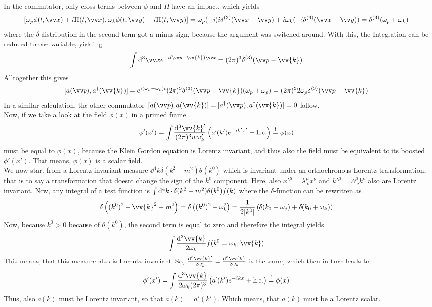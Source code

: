 In the commutator, only cross terms between $\phi$ and $\Pi$ have an impact, which yields
\[ [ \omega_p \phi(t, \vx) + i \Pi(t, \vx), \omega_k\phi(t, \vy) - i \Pi(t, \vy)] = \omega_p(-i)i\delta^{(3)}(\vx - \vy) + i \omega_k ( -i \delta^{(3)}(\vx - \vy)) = \delta^{(3)} ( \omega_p + \omega_k)\]
where the $\delta$-distribution in the second term got a minus sign, because the argument was switched around. With this, the Integration can be reduced to one variable, yielding 
\[ \int \dd^3 \vx e^{-i ( \vp - \vv{k} ) \vx} = (2\pi)^3 \delta^{(3)}(\vp - \vv{k})\]
Alltogether this gives
\[ [a(\vp) , a^\dagger( \vv{k})] = e^{i(\omega_p - \omega_p)t} (2\pi)^3 \delta^{(3)}(\vp - \vv{k}) ( \omega_p + \omega_p) = (2\pi)^3 2 \omega _p \delta^{(3)}(\vp - \vv{k})\]
In a similar calculation, the other commutator $[a(\vp), a(\vv{k})] = [a^\dagger(\vp), a^\dagger(\vv{k})] = 0$ follow.\\
Now, if we take a look at the field $\phi(x)$ in a primed frame
\[ \phi'(x') = \int \frac{\dd^3 \vv{k}'}{(2\pi)^3 w \omega_k'} \left( a'(k') e^{-i k'x'} + \hc\right) \soll \phi(x)\]
must be equal to $\phi(x)$, because the Klein Gordon equation is Lorentz invariant, and thus also the field must be equivalent to its boosted $\phi'(x')$. That means, $\phi(x)$ is a scalar field.\\
We now start from a Lorentz invariant measure $\dd ^4 k \delta( k^2 - m^2) \theta(k^0)$ which is invariant under an orthochronous Lorentz transformation, that is to say a transformation that doesnt change the sign of the $k^0$ component. Here, also $x'^\mu = \lambda^\mu_{~\nu} x^\nu$ and $k'^\mu = \Lambda^\mu_{~\nu}k^\nu$ also are Lorentz invariant. Now, any integral of a test function is $\int {\rm d}^4 k\cdot \delta(k^2 - m^2) \theta(k^0) f(k)$ where the $\delta$-function can be rewritten as
\[ \delta\left( (k^0)^2 - \vv{k}^2 - m^2\right) = \delta\left( (k^0)^2 - \omega_k^2\right) = \frac{1}{2 |k^0|} \left( \delta( k_0 - \omega_j) + \delta( k_0 + \omega_k)\right) \]
Now, because $k^0 > 0$ because of $\theta(k^0)$, the second term is equal to zero and therefore the integral yields
\[ \int \frac{\dd^3 \vv{k}}{2 \omega_k} f( k^0 = \omega_k, \vv{k})\]
This means, that this measure also is Lorentz invariant. So, $\frac{\dd^3 \vv{k}'}{2\omega_k'} = \frac{\dd^3 \vv{k}}{2 \omega_k}$ is the same, which then in turn leads to
\[ \phi'(x') = \int \frac{ \dd^3 \vv{k}}{2 \omega_k (2\pi)^3} \left( a'(k') e^{-i k x} + \hc\right) \soll \phi(x)\]
Thus, also $a(k)$ must be Lorentz invariant, so that $a(k) = a'(k')$. Which means, that $a(k)$ must be a Lorentz scalar.\\
